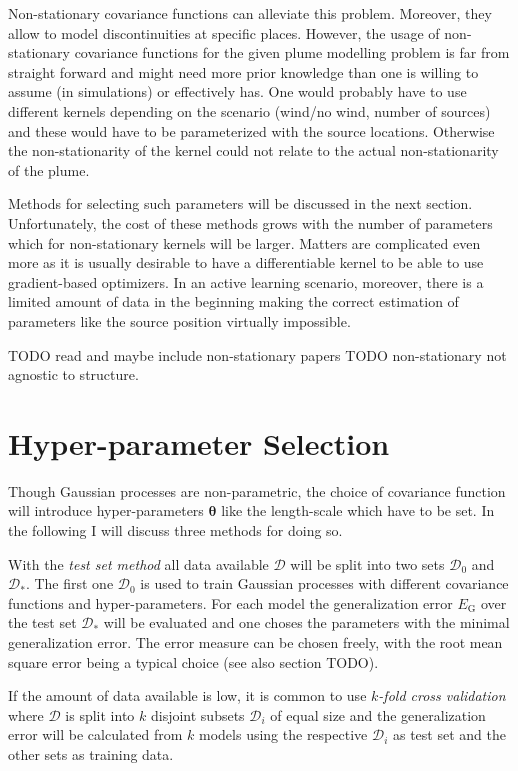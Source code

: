 \documentclass[11pt,a4paper,twoside,BCOR=15mm]{scrreprt}
\newcommand{\vc}[1]{\bm{#1}}
\newcommand{\ped}[1]{_{\mathrm{#1}}}
\newcommand{\newterm}[1]{\emph{#1}}
\begin{document}
Non-stationary covariance functions can alleviate this problem. Moreover, they 
allow to model discontinuities at specific places. However, the usage of 
non-stationary covariance functions for the given plume modelling problem is far 
from straight forward and might need more prior knowledge than one is willing to 
assume (in simulations) or effectively has.  One would probably have to use 
different kernels depending on the scenario (wind/no wind, number of sources) 
and these would have to be parameterized with the source locations. Otherwise 
the non-stationarity of the kernel could not relate to the actual 
non-stationarity of the plume.

Methods for selecting such parameters will be discussed in the next section.  
Unfortunately, the cost of these methods grows with the number of parameters 
which for non-stationary kernels will be larger. Matters are complicated even 
more as it is usually desirable to have a differentiable kernel to be able to 
use gradient-based optimizers. In an active learning scenario, moreover, there 
is a limited amount of data in the beginning making the correct estimation of 
parameters like the source position virtually impossible.

TODO read and maybe include non-stationary papers
TODO non-stationary not agnostic to structure.

\section{Hyper-parameter Selection}
Though Gaussian processes are non-parametric, the choice of covariance function 
will introduce hyper-parameters $\vc \theta$ like the length-scale which have to 
be set.  In the following I will discuss three methods for doing so.

With the \newterm{test set method} all data available $\mathcal{D}$ will be 
split into two sets $\mathcal{D}_0$ and $\mathcal{D}_*$. The first one 
$\mathcal{D}_0$ is used to train Gaussian processes with different covariance 
functions and hyper-parameters. For each model the generalization error 
$E\ped{G}$ over the test set $\mathcal{D}_*$ will be evaluated and one choses 
the parameters with the minimal generalization error. The error measure can be 
chosen freely, with the root mean square error being a typical choice (see also 
section TODO).

If the amount of data available is low, it is common to use \newterm{$k$-fold 
    cross validation} where $\mathcal{D}$ is split into $k$ disjoint subsets 
$\mathcal{D}_i$ of equal size and the generalization error will be calculated 
from $k$ models using the respective $\mathcal{D}_i$ as test set and the other 
sets as training data.
\end{document}

